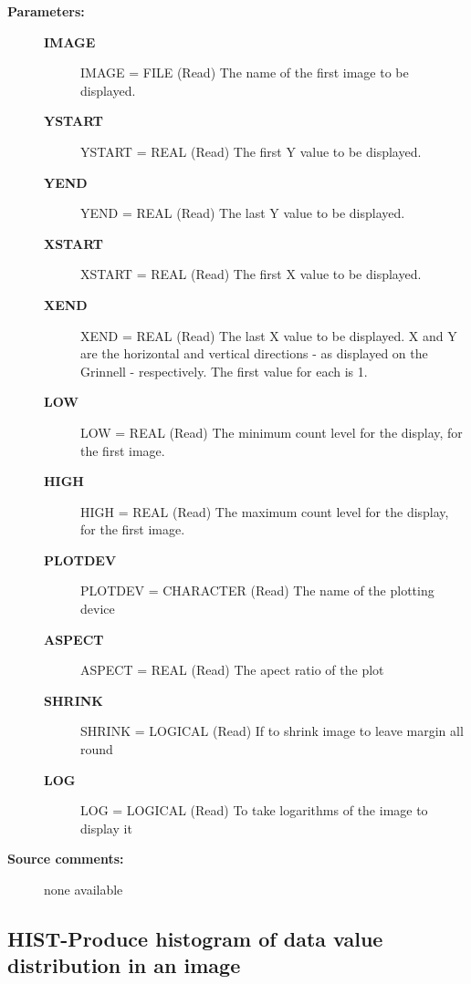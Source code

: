 \begin{description}
\begin{description}
\item [\textbf{Parameters:}]
\begin{description}
\item [\textbf{IMAGE}]
     IMAGE = FILE (Read)
        The name of the first image to be displayed.
\item [\textbf{YSTART}]
     YSTART = REAL (Read)
        The first Y value to be displayed.
\item [\textbf{YEND}]
     YEND = REAL (Read)
        The last Y value to be displayed.
\item [\textbf{XSTART}]
     XSTART = REAL (Read)
        The first X value to be displayed.
\item [\textbf{XEND}]
     XEND = REAL (Read)
        The last X value to be displayed.
             X and Y are the horizontal and vertical directions
             - as displayed on the Grinnell - respectively.  The
             first value for each is 1.
\item [\textbf{LOW}]
     LOW = REAL (Read)
        The minimum count level for the display, for
             the first image.
\item [\textbf{HIGH}]
     HIGH = REAL (Read)
        The maximum count level for the display, for
             the first image.
\item [\textbf{PLOTDEV}]
     PLOTDEV = CHARACTER (Read)
        The name of the plotting device
\item [\textbf{ASPECT}]
     ASPECT = REAL (Read)
        The apect ratio of the plot
\item [\textbf{SHRINK}]
     SHRINK = LOGICAL (Read)
        If to shrink image to leave margin all round
\item [\textbf{LOG}]
     LOG = LOGICAL (Read)
        To take logarithms of the image to display it
\end{description}

\item [\textbf{Source comments:}]
\begin{terminalv}
  none available

\end{terminalv}
\end{description}
\subsection{HIST-\label{HIST}Produce histogram of data value distribution in an image}
\begin{description}


\end{description}
\end{description}
